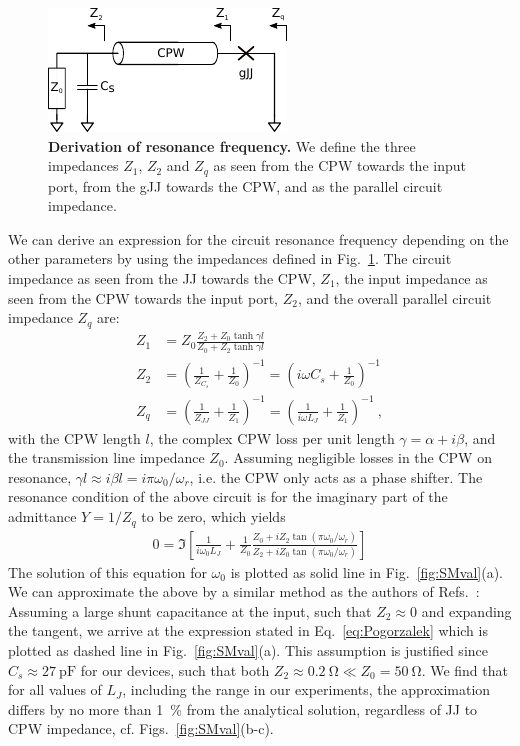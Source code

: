 \begin{figure}
	\centering
	\includegraphics[width=0.5\linewidth]{chapter-gJJ-CPR/figs/rfderivation}
	\caption{
		\textbf{Derivation of resonance frequency.}
		We define the three impedances $Z_1$, $Z_2$ and $Z_q$ as seen from the CPW towards the input port, from the gJJ towards the CPW, and as the parallel circuit impedance.
	}
	\label{fig:rfderivation}
\end{figure}

We can derive an expression for the circuit resonance frequency depending on the other parameters by using the impedances defined in Fig.~\ref{fig:rfderivation}.
%
The circuit impedance as seen from the JJ towards the CPW, $Z_1$, the input impedance as seen from the CPW towards the input port, $Z_2$, and the overall parallel circuit impedance $Z_q$ are:
%
\begin{align}
Z_1 &= Z_0 \frac{Z_2+Z_0\tanh\gamma l}{Z_0+Z_2\tanh\gamma l} \\
Z_2 &= \left(\frac{1}{Z_{C_s}}+\frac{1}{Z_0}\right)^{-1} = \left(i\omega C_s+\frac{1}{Z_0}\right)^{-1} \\
Z_q &= \left(\frac{1}{Z_{JJ}}+\frac{1}{Z_1}\right)^{-1} = \left(\frac{1}{i\omega L_J}+\frac{1}{Z_1}\right)^{-1}\ ,
\end{align}
%
with the CPW length $l$, the complex CPW loss per unit length $\gamma=\alpha+i\beta$, and the transmission line impedance $Z_0$.
%
Assuming negligible losses in the CPW on resonance, $\gamma l\approx i\beta l = i\pi\omega_0/\omega_r$, i.e. the CPW only acts as a phase shifter.
%
The resonance condition of the above circuit is for the imaginary part of the admittance $Y=1/Z_q$ to be zero, which yields
%
\begin{align}
0 = \Im \left[ \frac{1}{i\omega_0 L_J} + \frac{1}{Z_0}\frac{Z_0+iZ_2\tan\left(\pi\omega_0/\omega_r\right)}{Z_2+iZ_0\tan\left(\pi\omega_0/\omega_r\right)}\right]
\label{eq:SolAnalytical}
\end{align}
%
The solution of this equation for $\omega_0$ is plotted as solid line in Fig.~\ref{fig:SMval}(a).
%
We can approximate the above by a similar method as the authors of Refs.~\cite{wallquistSelectiveCouplingSuperconducting2006a,wustmannParametricResonanceTunable2013,pogorzalekHystereticFluxResponse2017}:
%
Assuming a large shunt capacitance at the input, such that $Z_2\approx 0$ and expanding the tangent, we arrive at the expression stated in Eq.~\ref{eq:Pogorzalek} which is plotted as dashed line in Fig.~\ref{fig:SMval}(a).
%
This assumption is justified since $C_s\approx\SI{27}{\pico\farad}$ for our devices, such that both $Z_2\approx \SI{0.2}{\ohm} \ll Z_0=\SI{50}{\ohm}$.
%
We find that for all values of $L_J$, including the range in our experiments, the approximation differs by no more than \SI{1}{\percent} from the analytical solution, regardless of JJ to CPW impedance, cf. Figs.~\ref{fig:SMval}(b-c).


